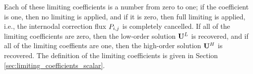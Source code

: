 Each of these limiting coefficients is a number from zero to one; if the
coefficient is one, then no limiting is applied, and if it is zero, then full
limiting is applied, i.e., the internodal correction flux
$\MakeUppercase{\correctionfluxletter}\ij$ is completely cancelled. If all of
the limiting coefficients are zero, then the low-order solution
$\lowordersolution$ is recovered, and if all of the limiting coeffients are
one, then the high-order solution $\highordersolution$ is recovered. The
definition of the limiting coefficients is given in Section
\ref{sec:limiting_coefficients_scalar}.
